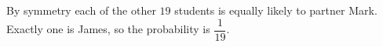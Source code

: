 By symmetry each of the other $19$ students is equally likely to partner Mark. Exactly one is James, so the probability is $\boxed{\dfrac{1}{19}}$.
